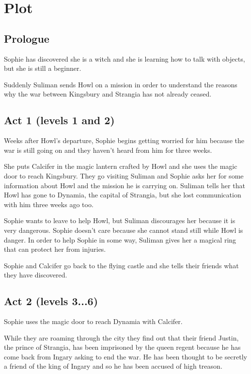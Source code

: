\section{Plot}

\subsection*{Prologue}
Sophie has discovered she is a witch and she is learning how to talk with objects, but she is still a beginner.

Suddenly Suliman sends Howl on a mission in order to understand the reasons why the war between Kingsbury and Strangia has not already ceased.

\subsection*{Act 1 (levels 1 and 2)}
Weeks after Howl's departure, Sophie begins getting worried for him because the war is still going on and they haven't heard from him for three weeks.

She puts Calcifer in the magic lantern crafted by Howl and she uses the magic door to reach Kingsbury. They go visiting Suliman and Sophie asks her for some information about Howl and the mission he is carrying on. Suliman tells her that Howl has gone to Dynamia, the capital of Strangia, but she lost communication with him three weeks ago too.

Sophie wants to leave to help Howl, but Suliman discourages her because it is very dangerous. Sophie doesn't care because she cannot stand still while Howl is danger. In order to help Sophie in some way, Suliman gives her a magical ring that can protect her from injuries.

Sophie and Calcifer go back to the flying castle and she tells their friends what they have discovered.

\subsection*{Act 2 (levels 3...6)}
Sophie uses the magic door to reach Dynamia with Calcifer.

While they are roaming through the city they find out that their friend Justin, the prince of Strangia, has been imprisoned by the queen regent because he has come back from Ingary asking to end the war. He has been thought to be secretly a friend of the king of Ingary and so he has been accused of high treason. 

